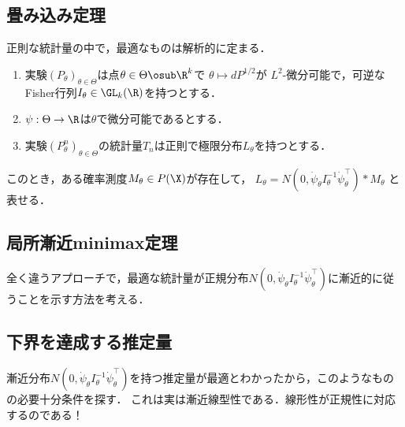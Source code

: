 \documentclass[uplatex,dvipdfmx]{jsreport}
\begin{document}
\subsection{畳み込み定理}

\begin{tcolorbox}[colframe=ForestGreen, colback=ForestGreen!10!white,breakable,colbacktitle=ForestGreen!40!white,coltitle=black,fonttitle=\bfseries\sffamily,
title=]
    正則な統計量の中で，最適なものは解析的に定まる．
\end{tcolorbox}

\begin{theorem}\mbox{}
    \begin{enumerate}[({E}1)]
        \item 実験$(P_\theta)_{\theta\in\Theta}$は点$\theta\in\Theta\osub\R^k$で
        $\theta\mapsto dP^{1/2}$が
        $L^2$-微分可能で，可逆なFisher行列$I_\theta\in\GL_k(\R)$を持つとする．
        \item $\psi:\Theta\to\R$は$\theta$で微分可能であるとする．
        \item 実験$(P^n_\theta)_{\theta\in\Theta}$の統計量$T_n$は正則で極限分布$L_\theta$を持つとする．
    \end{enumerate}
    このとき，ある確率測度$M_\theta\in P(\X)$が存在して，
    $L_\theta=N(0,\dot{\psi}_{\theta}I^{-1}_\theta\dot{\psi}_{\theta}^\top)*M_\theta$
    と表せる．
\end{theorem}

\subsection{局所漸近minimax定理}

\begin{tcolorbox}[colframe=ForestGreen, colback=ForestGreen!10!white,breakable,colbacktitle=ForestGreen!40!white,coltitle=black,fonttitle=\bfseries\sffamily,
title=]
    全く違うアプローチで，最適な統計量が正規分布$N(0,\dot{\psi}_{\theta}I^{-1}_\theta\dot{\psi}_{\theta}^\top)$に漸近的に従うことを示す方法を考える．
\end{tcolorbox}

\subsection{下界を達成する推定量}

\begin{tcolorbox}[colframe=ForestGreen, colback=ForestGreen!10!white,breakable,colbacktitle=ForestGreen!40!white,coltitle=black,fonttitle=\bfseries\sffamily,
title=]
    漸近分布$N(0,\dot{\psi}_{\theta}I^{-1}_\theta\dot{\psi}_{\theta}^\top)$を持つ推定量が最適とわかったから，このようなものの必要十分条件を探す．
    これは実は漸近線型性である．線形性が正規性に対応するのである！
\end{tcolorbox}
\end{document}
